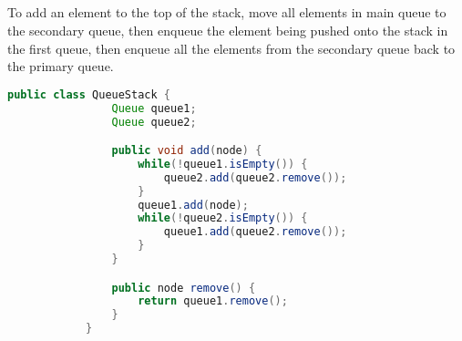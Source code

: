 \documentclass{article}
\begin{document}
        \subsection{}
        To add an element to the top of the stack, move all elements in main queue to the secondary queue, then enqueue the element being pushed onto the stack in the first queue, then enqueue all the elements from the secondary queue back to the primary queue.
        \begin{lstlisting}[language=java]
            public class QueueStack {
                Queue queue1;
                Queue queue2;

                public void add(node) {
                    while(!queue1.isEmpty()) {
                        queue2.add(queue2.remove());
                    }
                    queue1.add(node);
                    while(!queue2.isEmpty()) {
                        queue1.add(queue2.remove());
                    }
                }

                public node remove() {
                    return queue1.remove();
                }
            }
        \end{lstlisting}
    \section{}
    \subsection{}
\end{document}
